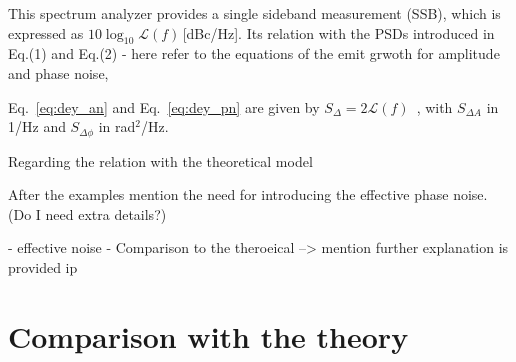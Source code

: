 This spectrum analyzer provides a single sideband measurement (SSB), which is expressed as $10\log_{10}\mathcal{L}(f)$\,[dBc/Hz]. Its relation with the PSDs introduced in Eq.(1) and Eq.(2) - here refer to the equations of the emit grwoth for amplitude and phase noise, 

Eq.~\eqref{eq:dey_an} and Eq.~\eqref{eq:dey_pn} are given by $S_\Delta = 2\mathcal{L}(f)$~\cite{IEEE_standards}, with $S_{\Delta A}$ in 1/Hz and $S_{\Delta\phi}$ in rad$^2$/Hz.




Regarding the relation with the theoretical model 



 After the examples mention the need for introducing the effective phase noise. (Do I need extra details?)
 

 - effective noise
 - Comparison to the theroeical --> mention further explanation is provided ip 

 \section{Comparison with the theory}\label{sec:MD2018_vs_theory}